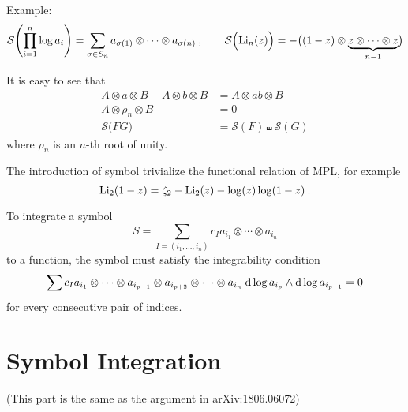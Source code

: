 \documentclass[12pt]{article}
\begin{document}
Example:
\begin{equation}
    \mathcal{S}\Biggl( \prod_{i=1}^{n} \log a_{i}\Biggr)=\sum_{\sigma\in S_{n}} a_{\sigma(1)}\otimes\cdots \otimes a_{\sigma(n)} \:, \qquad 
    \mathcal{S}\Bigl(\operatorname{Li}_{n}(z)\Bigr)=-\bigl((1-z)\otimes \underbrace{z\otimes \cdots \otimes z}_{n-1} \bigr)
\end{equation}

It is easy to see that
\begin{align}
    A\otimes a\otimes B+A\otimes b \otimes B &= A\otimes ab \otimes B \\
     A\otimes \rho_{n} \otimes B &= 0 \\
    \mathcal{S}\bigl(FG\bigr) &=\mathcal{S}(F)\shuffle\mathcal{S}(G)
\end{align}
where $\rho_{n}$ is an $n$-th root of unity. 

The introduction of symbol trivialize the functional relation of MPL, for example
\begin{equation}
    \operatorname{Li}_{2}(1-z)=\zeta_{2}-\operatorname{Li}_{2}(z)-\log(z)\log(1-z) \:.
\end{equation}

To integrate a symbol 
\begin{equation}
    S=\sum_{I=(i_{1},\ldots,i_{n})}c_{I}a_{i_{1}}\otimes\cdots\otimes a_{i_{n}}
\end{equation}
to a function, the symbol must satisfy the integrability condition
\begin{equation}
    \sum c_{I} a_{i_{1}} \otimes \cdots \otimes a_{i_{p-1}}\otimes a_{i_{p+2}} \otimes \cdots\otimes a_{i_{n}} \:
    \mathrm{d}\log a_{i_{p}}\wedge \mathrm{d} \log a_{i_{p+1}} =0
\end{equation}
for every consecutive pair of indices.

\section{Symbol Integration}
(This part is the same as the argument in arXiv:1806.06072)
\end{document}
